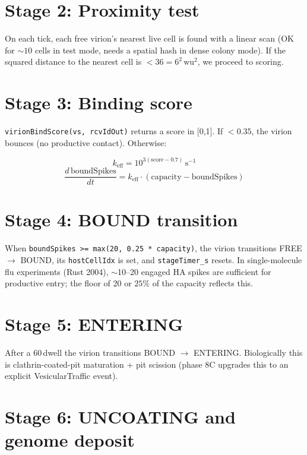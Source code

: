 \documentclass[11pt,letterpaper,twoside,openany]{book}
\newcommand{\code}[1]{\texttt{#1}}
\newcommand{\biosec}{\text{bio-s}}
\newcommand{\wu}{\text{wu}}
\begin{document}
\section{Stage 2: Proximity test}

On each tick, each free virion's nearest live cell is found with a
linear scan (OK for $\sim 10$ cells in test mode, needs a spatial
hash in dense colony mode). If the squared distance to the nearest
cell is $< 36 = 6^2\,\wu^2$, we proceed to scoring.

\section{Stage 3: Binding score}

\code{virionBindScore(vs, rcvIdOut)} returns a score in [0,1]. If
$< 0.35$, the virion bounces (no productive contact). Otherwise:

\begin{equation}
  k_{\text{eff}} = 10^{3(\text{score}-0.7)}\,\text{s}^{-1}
\end{equation}
\begin{equation}
  \frac{d\,\text{boundSpikes}}{dt} = k_{\text{eff}}\cdot(\text{capacity} - \text{boundSpikes})
\end{equation}

\section{Stage 4: BOUND transition}

When \code{boundSpikes >= max(20, 0.25 * capacity)}, the virion
transitions FREE $\to$ BOUND, its \code{hostCellIdx} is set, and
\code{stageTimer\_s} resets. In single-molecule flu experiments
(Rust 2004), $\sim$10--20 engaged HA spikes are sufficient for
productive entry; the floor of 20 or $25\%$ of the capacity reflects
this.

\section{Stage 5: ENTERING}

After a 60\,\biosec dwell the virion transitions BOUND $\to$
ENTERING. Biologically this is clathrin-coated-pit maturation + pit
scission (phase 8C upgrades this to an explicit VesicularTraffic
event).

\section{Stage 6: UNCOATING and genome deposit}
\end{document}
